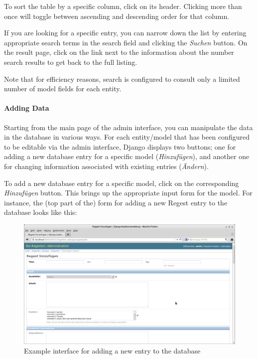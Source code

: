 To sort the table by a specific column, click on its header. Clicking
more than once will toggle between ascending and descending order for
that column.

If you are looking for a specific entry, you can narrow down the list
by entering appropriate search terms in the search field and clicking
the \emph{Suchen} button. On the result page, click on the link next
to the information about the number search results to get back to the
full listing.

Note that for efficiency reasons, search is configured to consult only
a limited number of model fields for each entity.

\paragraph{Adding Data}
Starting from the main page of the admin interface, you can manipulate
the data in the database in various ways. For each entity/model that
has been configured to be editable via the admin interface, Django
displays two buttons; one for adding a new database entry for a
specific model (\emph{Hinzufügen}), and another one for changing
information associated with existing entries (\emph{Ändern}).

To add a new database entry for a specific model, click on the
corresponding \emph{Hinzufügen} button. This brings up the appropriate
input form for the model. For instance, the (top part of the) form for
adding a new Regest entry to the database looks like this:

\begin{figure}[h]
  \centering
  \includegraphics[scale=0.3]{img/add-regest}
  \caption{Example interface for adding a new entry to the database}
  \label{fig:add-regest}
\end{figure}

